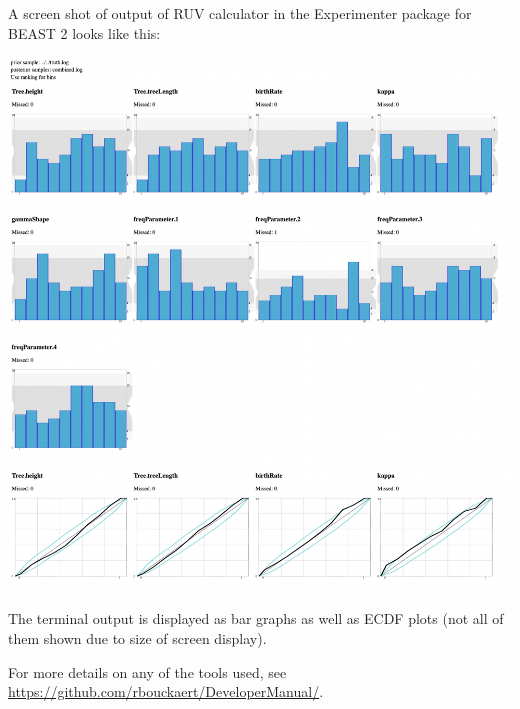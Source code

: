 \documentclass[oneside]{article}
\begin{document}
A screen shot of output of RUV calculator in the Experimenter package for BEAST 2 looks like this:

   \includegraphics[width=\textwidth]{../figures/sbscalculator.png}

   {
   The terminal output is displayed as bar graphs as well as ECDF plots (not all of them shown due to size of screen display).}
 

For more details on any of the tools used, see \url{https://github.com/rbouckaert/DeveloperManual/}.

\clearpage


\end{document}
